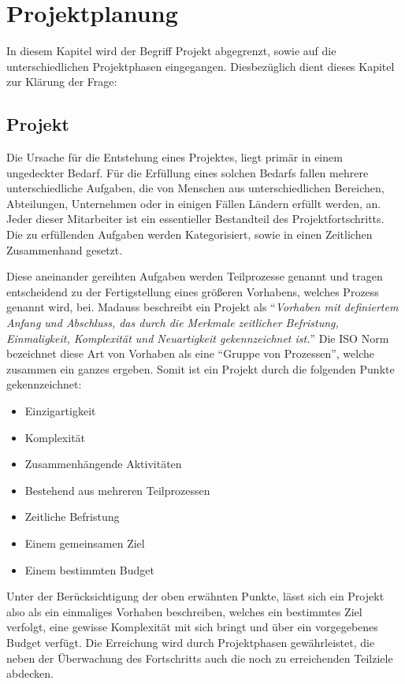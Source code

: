 \chapter{Projektplanung}
\label{chap:projektablauf}

	In diesem Kapitel wird der Begriff Projekt abgegrenzt, sowie auf die unterschiedlichen Projektphasen eingegangen. Diesbezüglich dient dieses Kapitel zur Klärung der Frage: \ersteUnterfrage

\section{Projekt}

	Die Ursache für die Entstehung eines Projektes, liegt primär in einem ungedeckter Bedarf. Für die Erfüllung eines solchen Bedarfs fallen mehrere unterschiedliche Aufgaben, die von Menschen aus unterschiedlichen Bereichen, Abteilungen, Unternehmen oder in einigen Fällen Ländern erfüllt werden, an. Jeder dieser Mitarbeiter ist ein essentieller Bestandteil des Projektfortschritts. Die zu erfüllenden Aufgaben werden Kategorisiert, sowie in einen Zeitlichen Zusammenhand gesetzt.\cite[4]{Wysocki_2019_Projekt}
	
	Diese aneinander gereihten Aufgaben werden Teilprozesse genannt und tragen entscheidend zu der Fertigstellung eines größeren Vorhabens, welches Prozess genannt wird, bei. Madauss beschreibt ein Projekt als \enquote{\textit{Vorhaben mit definiertem Anfang und Abschluss, das durch die Merkmale zeitlicher Befristung, Einmaligkeit, Komplexität und Neuartigkeit gekennzeichnet ist.}}\cite[4]{Madauss2020} Die ISO Norm bezeichnet diese Art von Vorhaben als eine \enquote{Gruppe von Prozessen}\cite[11]{ISO10006_2019}, welche zusammen ein ganzes ergeben. Somit ist ein Projekt durch die folgenden Punkte gekennzeichnet: 
	
	\begin{itemize}
		\item Einzigartigkeit 
		\item Komplexität
		\item Zusammenhängende Aktivitäten
		\item Bestehend aus mehreren Teilprozessen
		\item Zeitliche Befristung 
		\item Einem gemeinsamen Ziel
		\item Einem bestimmten Budget
	\end{itemize}
	
	Unter der Berücksichtigung der oben erwähnten Punkte, lässt sich ein Projekt also als ein einmaliges Vorhaben beschreiben, welches ein bestimmtes Ziel verfolgt, eine gewisse Komplexität mit sich bringt und über ein vorgegebenes Budget verfügt. \cite[4-7]{Wysocki_2019_Projekt}
	Die Erreichung wird durch Projektphasen gewährleistet, die neben der Überwachung des Fortschritts auch die noch zu erreichenden Teilziele abdecken. 
	
